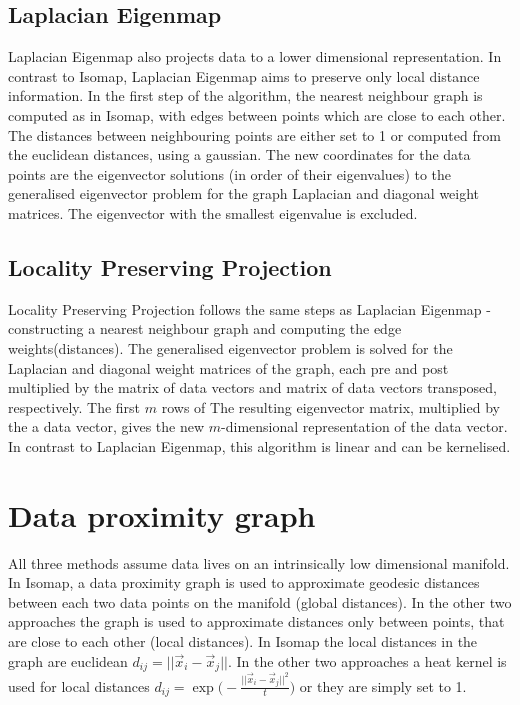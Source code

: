 \documentclass[a4paper, 11pt]{article}
\begin{document}
\subsection{Laplacian Eigenmap}
Laplacian Eigenmap \cite{Belkin2003} also projects data to a lower dimensional representation. In contrast to Isomap, Laplacian Eigenmap aims to preserve only local distance information. In the first step of the algorithm, the nearest neighbour graph is computed as in Isomap, with edges between points which are close to each other. The distances between neighbouring points are either set to 1 or computed from the euclidean distances, using a gaussian. The new coordinates for the data points are the eigenvector solutions (in order of their eigenvalues) to the generalised eigenvector problem for the graph Laplacian and diagonal weight matrices. The eigenvector with the smallest eigenvalue is excluded. 


\subsection{Locality Preserving Projection}
Locality Preserving Projection \cite{Xiaofei2005} follows the same steps as Laplacian Eigenmap - constructing a nearest neighbour graph and computing the edge weights(distances). The generalised eigenvector problem is solved for the Laplacian and diagonal weight matrices of the graph, each pre and post multiplied by the matrix of data vectors and matrix of data vectors transposed, respectively. The first $m$ rows of The resulting eigenvector matrix, multiplied by the a data vector, gives the new $m$-dimensional representation of the data vector. In contrast to Laplacian Eigenmap, this algorithm is linear and can be kernelised.


\section*{Data proximity graph}
All three methods assume data lives on an intrinsically low dimensional manifold. In Isomap, a data proximity graph is used to approximate geodesic distances between each two data points on the manifold (global distances). In the other two approaches the graph is used to approximate distances only between points, that are close to each other (local distances). In Isomap the local distances in the graph are euclidean $d_{ij} = ||\vec{x}_i - \vec{x}_j||$. In the other two approaches a heat kernel is used for local distances $d_{ij} = \exp{\Big(-\frac{||\vec{x}_i - \vec{x}_j||^2}{t}	\Big)}$ or they are simply set to 1.
\end{document}
